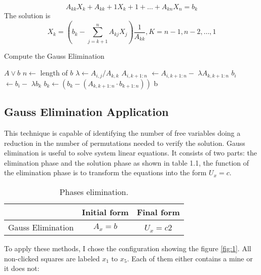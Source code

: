 \documentclass[a4paper]{article}
\numberwithin{equation}{subsection}
\begin{document}
\vspace{5mm} %
\begin{equation} \tag{1.3}
    A_{kk}X_k+A_{kk}+1X_k+1+\dots+A_{kn}X_n=b_k
\end{equation}
The solution is
\begin{equation} \tag{1.4}
    X_k=\left ( b_k-\sum_{j=k+1}^{n} A_{kj}X_j \right  )\frac{1}{A_{kk}}, K=n-1,n-2,\dots,1
\end{equation}
\begin{algorithm}[H]
\caption{Compute the Gauss Elimination}
\begin{algorithmic}
\REQUIRE $A \vee  b$ 
\STATE $n \leftarrow$ length of $b$
\STATE  $\lambda \leftarrow A_{i,j}/A_{k,k}$
\STATE $A_{i,k+1:n}$  $ \leftarrow A_{i,k+1:n}-$  $\lambda A_{k,k+1:n}$
\STATE $b_i$  $ \leftarrow b_i -$  $ \lambda b_k$
\ENDIF
\ENDFOR
\ENDFOR
{}
\STATE $b_k \leftarrow (b_k - (A_{k,k+1:n} \cdot b_{k+1:n}))$
\ENDFOR
\RETURN b 
\end{algorithmic}
\end{algorithm}

\subsection{Gauss Elimination Application}
This technique is capable of identifying the number of free variables doing a reduction in the number of permutations needed to verify the solution.  Gauss elimination is useful to solve system linear equations. It consists of two parts:  the elimination phase and the solution phase as shown in table 1.1, the function of the elimination phase is to transform the equations into the form $U_x = c$.
\begin{table}[ht]
\centering
\caption{Phases elimination.}
\begin{tabular}[t]{lcc}
\hline
&Initial form &Final form \\
\hline
Gauss Elimination&$A_x=b$&$U_x=c$2\\
\hline
\end{tabular}
\end{table}%
\vspace{5mm} %
To apply these methods, I chose the configuration showing the figure \ref{fig:1}.  All non-clicked squares are labeled $x_1$ to $x_5$. Each of them either contains a mine or it does not:
\vspace{5mm} %
\end{document}

